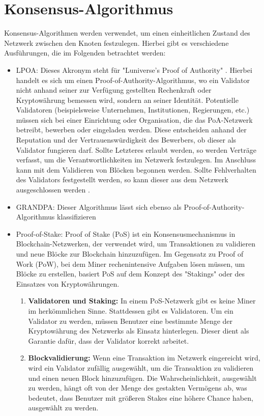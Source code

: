 \section{Konsensus-Algorithmus}
Konsensus-Algorithmen werden verwendet, um einen einheitlichen Zustand des Netzwerk zwischen den Knoten festzulegen. Hierbei gibt es verschiedene Ausführungen, die im Folgenden betrachtet werden:
\begin{itemize}
	\item LPOA: Dieses Akronym steht für "Luniverse's Proof of Authority" \cite{ID50}. Hierbei handelt es sich um einen Proof-of-Authority-Algorithmus, wo ein Validator nicht anhand seiner zur Verfügung gestellten Rechenkraft oder Kryptowährung bemessen wird, sondern an seiner Identität. Potentielle Validatoren (beispielsweise Unternehmen, Institutionen, Regierungen, etc.) müssen sich bei einer Einrichtung oder Organisation, die das PoA-Netzwerk betreibt, bewerben oder eingeladen werden. Diese entscheiden anhand der Reputation und der Vertrauenswürdigkeit des Bewerbers, ob dieser als Validator fungieren darf. Sollte Letzteres erlaubt werden, so werden Verträge verfasst, um die Verantwortlichkeiten im Netzwerk festzulegen. Im Anschluss kann mit dem Validieren von Blöcken begonnen werden. Sollte Fehlverhalten des Validators festgestellt werden, so kann dieser aus dem Netzwerk ausgeschlossen werden \cite{ID51}.
	\item GRANDPA: Dieser Algorithmus lässt sich ebenso als Proof-of-Authority-Algorithmus klassifizieren
	\item Proof-of-Stake: Proof of Stake (PoS) ist ein Konsensusmechanismus in Blockchain-Netzwerken, der verwendet wird, um Transaktionen zu validieren und neue Blöcke zur Blockchain hinzuzufügen. Im Gegensatz zu Proof of Work (PoW), bei dem Miner rechenintensive Aufgaben lösen müssen, um Blöcke zu erstellen, basiert PoS auf dem Konzept des "Stakings" oder des Einsatzes von Kryptowährungen.
	\begin{enumerate}
		\item \textbf{Validatoren und Staking:} In einem PoS-Netzwerk gibt es keine Miner im herkömmlichen Sinne. Stattdessen gibt es Validatoren. Um ein Validator zu werden, müssen Benutzer eine bestimmte Menge der Kryptowährung des Netzwerks als Einsatz hinterlegen. Dieser dient als Garantie dafür, dass der Validator korrekt arbeitet.
		
		\item \textbf{Blockvalidierung:} Wenn eine Transaktion im Netzwerk eingereicht wird, wird ein Validator zufällig ausgewählt, um die Transaktion zu validieren und einen neuen Block hinzuzufügen. Die Wahrscheinlichkeit, ausgewählt zu werden, hängt oft von der Menge des gestakten Vermögens ab, was bedeutet, dass Benutzer mit größeren Stakes eine höhere Chance haben, ausgewählt zu werden.
		

\end{enumerate}
\end{itemize}
